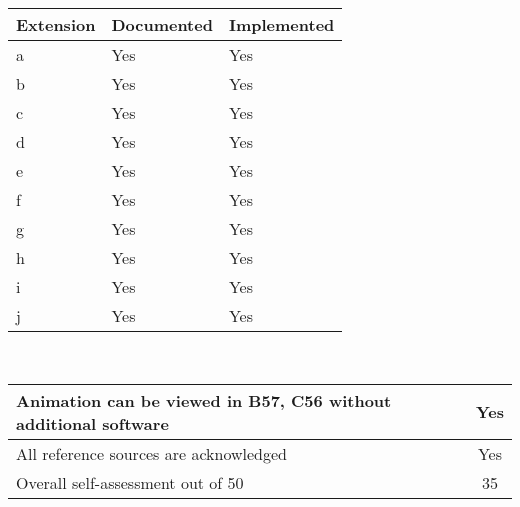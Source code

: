 \documentclass[titlepage]{article}
\begin{document}
        \vspace{1em}
        \begin{tabularx}{0.5\columnwidth}{| X | X | X |}
            \hline
            Extension & Documented & Implemented \\
            \hline
            a & Yes & Yes \\
            \hline
            b & Yes & Yes \\
            \hline
            c &Yes & Yes \\
            \hline
            d &Yes & Yes \\
            \hline
            e & Yes & Yes \\
            \hline
            f & Yes & Yes \\
            \hline
            g & Yes & Yes \\
            \hline
            h & Yes & Yes \\
            \hline
            i & Yes & Yes \\
            \hline
            j & Yes & Yes \\
            \hline
        \end{tabularx} \\

       
        \vspace{1em}
        \begin{tabularx}{0.5\columnwidth}{| X | c |}
            \hline
            Animation can be viewed in B57, C56 without additional software & Yes \\
            \hline
            All reference sources are acknowledged & Yes \\
            \hline
            Overall self-assessment out of 50 & 35 \\
            \hline
        \end{tabularx}
\end{document}
